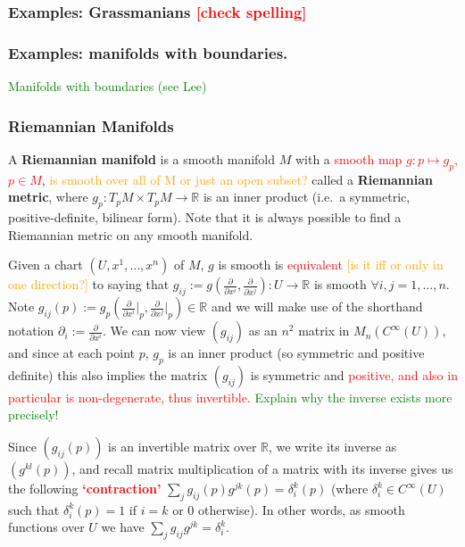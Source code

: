 \documentclass[a4paper]{article}
\theoremstyle{definition} \newtheorem*{definition}{Definition}
\theoremstyle{definition} \newtheorem*{definitions}{Definitions}
\theoremstyle{plain} \newtheorem{theorem}{Theorem}[section]
\theoremstyle{plain} \newtheorem{proposition}[theorem]{Proposition}
\theoremstyle{plain} \newtheorem{corollary}[theorem]{Corollary}
\theoremstyle{plain} \newtheorem{lemma}[theorem]{Lemma}
\theoremstyle{plain} \newtheorem{example}[theorem]{Example}
\newcommand{\checkCorrect}[1]{\textcolor{red}{#1}}
\newcommand{\question}[1]{\textcolor{orange}{#1}}
\newcommand{\finish}[1]{\textcolor{green}{#1}}
\newcommand{\defn}[1]{\textbf{#1}}
\newcommand{\realnos}{\mathbb{R}}
\begin{document}
\subsubsection{Examples: Grassmanians \checkCorrect{[check spelling]}}


\subsubsection{Examples: manifolds with boundaries.}
\finish{Manifolds with boundaries (see Lee)}

\subsubsection{Riemannian Manifolds}
A \defn{Riemannian manifold} is a smooth manifold $M$ with a \checkCorrect{smooth map $g:p\mapsto g_p$, $p\in M$}, \question{is smooth over all of M or just an open subset?} called a \defn{Riemannian metric}, where $g_p:T_pM\times T_pM\to \realnos$ is an inner product (i.e.\ a symmetric, positive-definite, bilinear form).
Note that it is always possible to find a Riemannian metric on any smooth manifold.

Given a chart $(U, x^1, \ldots, x^n)$ of $M$, $g$ is smooth is \checkCorrect{equivalent} \question{[is it iff or only in one direction?]} to saying that $g_{ij}:=g(\frac{\partial}{\partial x^i}, \frac{\partial}{\partial x^j}):U\to \realnos$ is smooth $\forall i,j=1,\ldots, n$. Note $g_{ij}(p):=g_p(\frac{\partial}{\partial x^i}\vert_p, \frac{\partial}{\partial x^j}\vert_p) \in \realnos$ and we will make use of the shorthand notation $\partial_i:=\frac{\partial}{\partial x^i}$. We can now view $(g_{ij})$ as an $n^2$ matrix in $M_n(C^\infty (U))$, and since at each point $p$, $g_p$ is an inner product (so symmetric and positive definite) this also implies the matrix $(g_{ij})$ is symmetric and \checkCorrect{positive, and also in particular is non-degenerate, thus invertible.} \finish{Explain why the inverse exists more precisely!}

Since $(g_{ij}(p))$ is an invertible matrix over $\realnos$, we write its inverse as $(g^{kl}(p))$, and recall matrix multiplication of a matrix with its inverse gives us the following \checkCorrect{\defn{`contraction'}}
$\sum_j g_{ij}(p)g^{jk}(p)=\delta_i^k(p)$ (where $\delta_i^k\in C^\infty(U)$ such that $\delta_i^k(p)=1$ if $i=k$ or $0$ otherwise). In other words, as smooth functions over $U$ we have $\sum_j g_{ij}g^{jk}=\delta_i^k$. 
\end{document}
